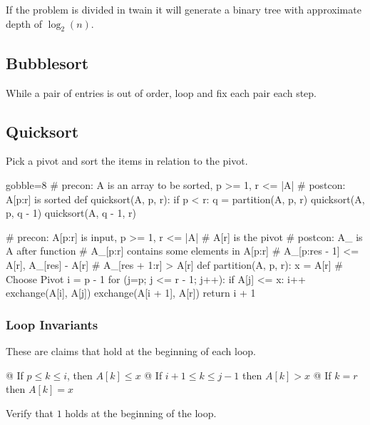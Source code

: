 \documentclass[10pt]{article}
\begin{document}
        If the problem is divided in twain it will generate a binary tree with approximate depth of $\log_2(n)$.

    \subsection{Bubblesort}
    While a pair of entries is out of order, loop and fix each pair each step.

    \subsection{Quicksort}
    Pick a pivot and sort the items in relation to the pivot.

    \begin{pythoncode*}{gobble=8}
        # precon:  A is an array to be sorted, p >= 1, r <= |A|
        # postcon: A[p:r] is sorted
        def quicksort(A, p, r):
            if p < r:
                q = partition(A, p, r)
                quicksort(A, p, q - 1)
                quicksort(A, q - 1, r)

        # precon:  A[p:r] is input, p >= 1, r <= |A|
        #          A[r] is the pivot
        # postcon: A_ is A after function
        #          A_[p:r] contains some elements in A[p:r]
        #          A_[p:res - 1] <= A[r], A_[res] - A[r]
        #          A_[res + 1:r] > A[r]
        def partition(A, p, r):
            x = A[r]                     # Choose Pivot
            i = p - 1
            for (j=p; j <= r - 1; j++):
                if A[j] <= x:
                    i++
                    exchange(A[i], A[j])
            exchange(A[i + 1], A[r])
            return i + 1
    \end{pythoncode*}

        \subsubsection{Loop Invariants}
        These are claims that hold at the beginning of each loop.

        \NewList
        \begin{easylist}[enumerate]
            @ If $ p \le k \le i$, then $A[k] \le x$
            @ If $ i + 1 \le k \le j - 1$ then $A[k] > x$
            @ If $ k = r $ then $A[k] = x$
        \end{easylist}

        Verify that $\boxed{1}$ holds at the beginning of the loop.
\end{document}
